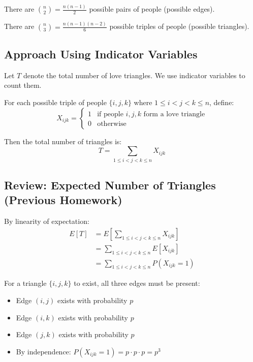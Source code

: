 \documentclass[11pt]{article}
\begin{document}
There are $\binom{n}{2} = \frac{n(n-1)}{2}$ possible pairs of people (possible edges).

There are $\binom{n}{3} = \frac{n(n-1)(n-2)}{6}$ possible triples of people (possible triangles).

\vspace{1em}

\subsection*{Approach Using Indicator Variables}

Let $T$ denote the total number of love triangles. We use indicator variables to count them.

For each possible triple of people $\{i, j, k\}$ where $1 \leq i < j < k \leq n$, define:
\[
X_{ijk} = \begin{cases}
1 & \text{if people } i, j, k \text{ form a love triangle} \\
0 & \text{otherwise}
\end{cases}
\]

Then the total number of triangles is:
\[
T = \sum_{1 \leq i < j < k \leq n} X_{ijk}
\]

\vspace{1em}

\subsection*{Review: Expected Number of Triangles (Previous Homework)}

By linearity of expectation:
\begin{align*}
E[T] &= E\left[\sum_{1 \leq i < j < k \leq n} X_{ijk}\right] \\
&= \sum_{1 \leq i < j < k \leq n} E[X_{ijk}] \\
&= \sum_{1 \leq i < j < k \leq n} P(X_{ijk} = 1)
\end{align*}

For a triangle $\{i,j,k\}$ to exist, all three edges must be present:
\begin{itemize}[leftmargin=2em]
    \item Edge $(i,j)$ exists with probability $p$
    \item Edge $(i,k)$ exists with probability $p$
    \item Edge $(j,k)$ exists with probability $p$
    \item By independence: $P(X_{ijk} = 1) = p \cdot p \cdot p = p^3$
\end{itemize}
\end{document}
